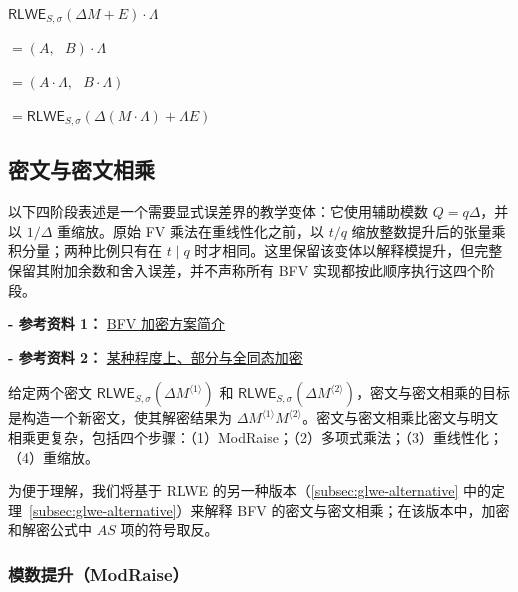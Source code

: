 \begin{tcolorbox}[title={\textbf{\tboxlabel{\ref*{subsec:bfv-mult-plain}} BFV 密文与明文相乘}}]
$\textsf{RLWE}_{S, \sigma}(\Delta M + E) \cdot \Lambda$

$= (A, \text{ } B) \cdot \Lambda$

$= (A \cdot \Lambda, \text{ }  B \cdot \Lambda )$

$= \textsf{RLWE}_{S, \sigma}(\Delta (M \cdot \Lambda) + \Lambda E)$
\end{tcolorbox}




\subsection{密文与密文相乘}
\label{subsec:bfv-mult-cipher}

以下四阶段表述是一个需要显式误差界的教学变体：它使用辅助模数 $Q=q\Delta$，并以 $1/\Delta$ 重缩放。原始 FV 乘法在重线性化之前，以 $t/q$ 缩放整数提升后的张量乘积分量；两种比例只有在 $t\mid q$ 时才相同。这里保留该变体以解释模提升，但完整保留其附加余数和舍入误差，并不声称所有 BFV 实现都按此顺序执行这四个阶段。

\noindent \textbf{- 参考资料 1：}
\href{https://www.inferati.com/blog/fhe-schemes-bfv}{BFV 加密方案简介}~\cite{inferati-bfv}

\noindent \textbf{- 参考资料 2：}
\href{https://eprint.iacr.org/2012/144.pdf}{某种程度上、部分与全同态加密}~\cite{cryptoeprint:2012/144}



给定两个密文 $\textsf{RLWE}_{S, \sigma}(\Delta M^{\langle 1\rangle })$ 和 $\textsf{RLWE}_{S, \sigma}(\Delta M^{\langle 2\rangle})$，密文与密文相乘的目标是构造一个新密文，使其解密结果为 $\Delta M^{\langle 1 \rangle} M^{\langle 2 \rangle}$。密文与密文相乘比密文与明文相乘更复杂，包括四个步骤：（1）\textsf{ModRaise}；（2）多项式乘法；（3）重线性化；（4）重缩放。

为便于理解，我们将基于 RLWE 的另一种版本（\autoref{subsec:glwe-alternative} 中的定理~\ref*{subsec:glwe-alternative}）来解释 BFV 的密文与密文相乘；在该版本中，加密和解密公式中 $AS$ 项的符号取反。

\subsubsection{模数提升（\textsf{ModRaise}）}
\label{subsubsec:bfv-mult-cipher-modraise}

